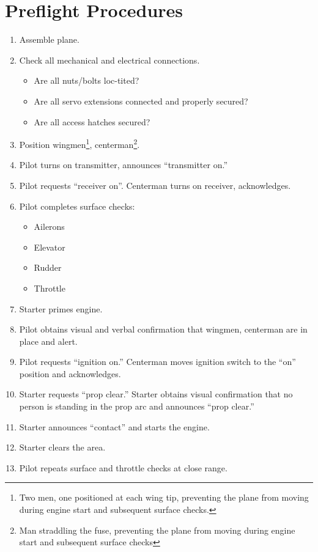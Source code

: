 \documentclass[10pt]{report}
\newcommand{\itemspace}{	\setlength{\itemsep}{0cm} \setlength{\parskip}{0cm}}
\begin{document}
\section{Preflight Procedures}
\label{sec:appendix_preflight}
\begin{enumerate}
	\setlength{\itemsep}{0cm}
	\setlength{\parskip}{0cm}
	\item Assemble plane.
	\item Check all mechanical and electrical connections.
		\begin{itemize}
		\itemspace
		\item Are all nuts/bolts loc-tited?
		\item Are all servo extensions connected and properly secured?
		\item Are all access hatches secured?
		\end{itemize}
	\item Position wingmen\footnote{Two men, one positioned at each wing tip, preventing the plane from moving during engine start and subsequent surface checks.}, centerman\footnote{Man straddling the fuse, preventing the plane from moving during engine start and subsequent surface checks}.
	\item Pilot turns on transmitter, announces ``transmitter on.''
	\item Pilot requests ``receiver on''.  Centerman turns on receiver, acknowledges.
	\item Pilot completes surface checks:
		\begin{itemize}
		\itemspace
		\item Ailerons
		\item Elevator
		\item Rudder
		\item Throttle
		\end{itemize}
	\item Starter primes engine.
	\item Pilot obtains visual and verbal confirmation that wingmen, centerman are in place and alert.
	\item Pilot requests ``ignition on.''  Centerman moves ignition switch to the ``on'' position and acknowledges.
	\item Starter requests ``prop clear.''  Starter obtains visual confirmation that no person is standing in the prop arc and announces ``prop clear.''
	\item Starter announces ``contact'' and starts the engine.
	\item Starter clears the area.
	\item Pilot repeats surface and throttle checks at close range.

\end{enumerate}
\end{document}
